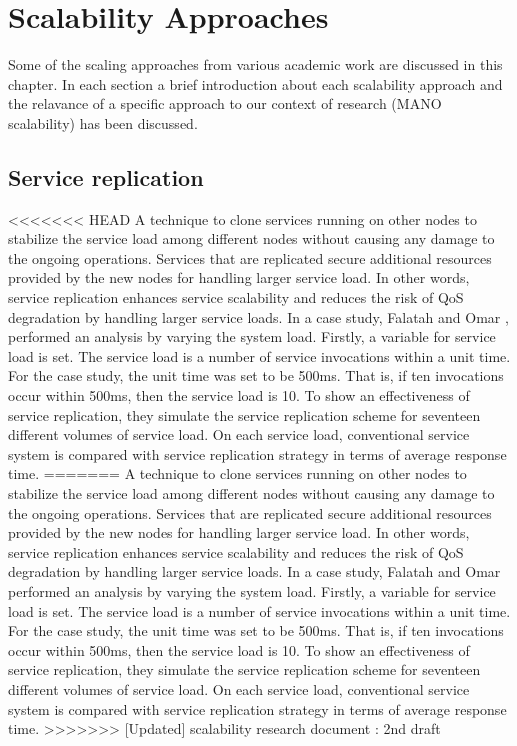 \chapter{Scalability Approaches}
\label{ch:Scalability Approaches}

Some of the scaling approaches from various academic work are discussed in this chapter. In each section a brief introduction about each  scalability approach and the relavance of a specific approach to our context of research (MANO scalability) has been discussed.

\section{Service replication}

<<<<<<< HEAD
A technique to clone services running on other nodes to stabilize the service load among different nodes without causing any damage to the ongoing operations. Services that are replicated secure additional resources provided by the new nodes for handling larger service load. In other words, service replication enhances service scalability and reduces the risk of QoS degradation by handling larger service loads. In a case study, Falatah and Omar \cite{falatah_cloud_2014}, performed an analysis by varying the system load. Firstly, a variable for service load is set. The service load is a number of service invocations within a unit time. For the case study, the unit time was set to be 500ms. That is, if ten invocations occur within 500ms, then the service load is 10. To show an effectiveness of service replication, they simulate the service replication scheme for seventeen different volumes of service load. On each service load, conventional service system is compared with service replication strategy in terms of average response time.
=======
A technique to clone services running on other nodes to stabilize the service load among different nodes without causing any damage to the ongoing operations. Services that are replicated secure additional resources provided by the new nodes for handling larger service load. In other words, service replication enhances service scalability and reduces the risk of QoS degradation by handling larger service loads. In a case study, \cite{falatah_cloud_2014} Falatah and Omar performed an analysis by varying the system load. Firstly, a variable for service load is set. The service load is a number of service invocations within a unit time. For the case study, the unit time was set to be 500ms. That is, if ten invocations occur within 500ms, then the service load is 10. To show an effectiveness of service replication, they simulate the service replication scheme for seventeen different volumes of service load. On each service load, conventional service system is compared with service replication strategy in terms of average response time.
>>>>>>> [Updated] scalability research document : 2nd draft

